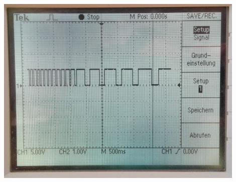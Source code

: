 {\begin{minipage}[b][650pt][t]{0.44\textwidth}
\label{fig:beschaltungAnemometer}
\vspace{20pt}
\includegraphics[width = 0.9\textwidth]{graphics/Anemometer/oszilloskop_anenometer_puls.png}
\label{fig:rechteckpuls_anemometer}
\end{minipage}}
\newpage



